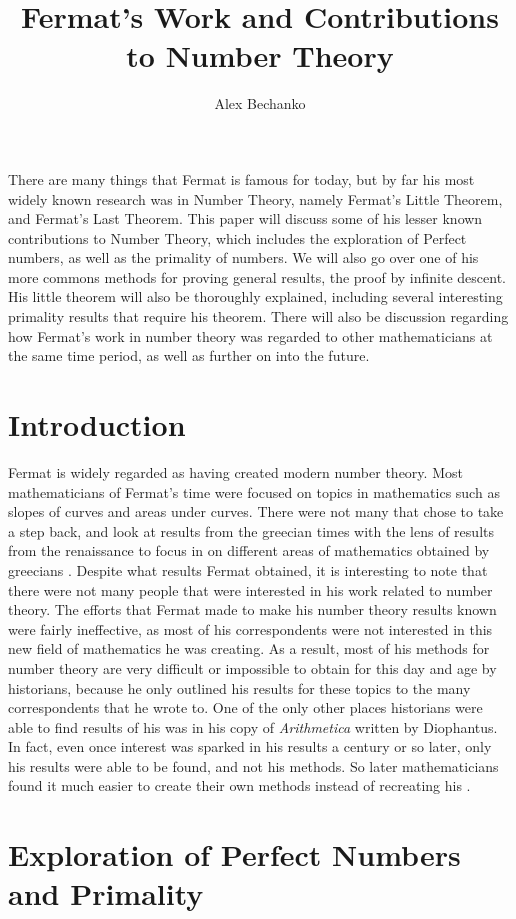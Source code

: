 \documentclass[11pt]{article}
\title{Fermat's Work and Contributions to Number Theory}
\author{Alex Bechanko}
\begin{document}
\maketitle
There are many things that Fermat is famous for today, but by far his most widely
known research was in Number Theory, namely Fermat's Little Theorem, and 
Fermat's Last Theorem.
This paper will discuss some of his lesser
known contributions to Number Theory, which includes the exploration of
Perfect numbers, as well as the primality of numbers.
We will also go over one of his more commons methods for proving general results,
the proof by infinite descent.
His little theorem will also be thoroughly explained, including several 
interesting primality results that require his theorem.
There will also be discussion regarding how Fermat's work in number
theory was regarded to other mathematicians at the same time period, as
well as further on into the future. 


\section*{Introduction}
Fermat is widely regarded as having created modern number theory.
Most mathematicians of Fermat's time were focused
on topics in mathematics such as slopes of curves and areas under curves.
There were not many that chose to take a step back, and look at 
results from the greecian times with the lens of results from the
renaissance to focus in on different areas of mathematics obtained by greecians \cite{Mahoney}. 
Despite what results Fermat obtained, it is interesting to note that there were
not many people that were interested in his work related to number theory.
The efforts that Fermat made to make his number theory results known were fairly
ineffective, as most of his correspondents were not interested in this new field of
mathematics he was creating.
As a result, most of his methods for number theory are very difficult or
impossible to obtain
for this day and age by historians, because he only outlined
his results for these topics to the many correspondents that he wrote
to.
One of the only other places historians were able to find results of his was in
his copy of \emph{Arithmetica} written by Diophantus.
In fact, even once interest was sparked in his results a century or so later,
only his results were able to be found, and not his methods.
So later mathematicians found it much easier to create their own methods
instead of recreating his \cite{Mahoney}.

\section*{Exploration of Perfect Numbers and Primality}
\end{document}
